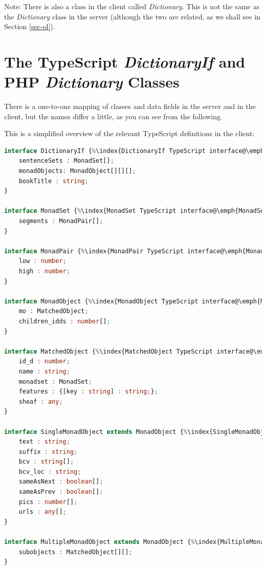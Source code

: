\documentclass[11pt,oneside,a4paper]{memoir}
\begin{document}
Note: There is also a class in the client called \emph{Dictionary}. This is not the same as the
\emph{Dictionary} class in the server (although the two are related, as we shall see in Section
\ref{sec-ol}).


\section{The TypeScript \emph{DictionaryIf} and PHP \emph{Dictionary} Classes}\label{sec-dictionaryif}%
%

There is a one-to-one mapping of classes and data fields in the server and in the client, but the
names differ a little, as you can see from the following.

This is a simplified overview of the relevant TypeScript definitions in the client:

\begin{lstlisting}[language=TypeScript]
interface DictionaryIf {%\index{DictionaryIf TypeScript interface@\emph{DictionaryIf} TypeScript interface}%
    sentenceSets : MonadSet[];
    monadObjects: MonadObject[][][];
    bookTitle : string;
}

interface MonadSet {%\index{MonadSet TypeScript interface@\emph{MonadSet} TypeScript interface}%
    segments : MonadPair[];
}

interface MonadPair {%\index{MonadPair TypeScript interface@\emph{MonadPair} TypeScript interface}%
    low : number;
    high : number;
}

interface MonadObject {%\index{MonadObject TypeScript interface@\emph{MonadObject} TypeScript interface}%
    mo : MatchedObject;
    children_idds : number[];
}

interface MatchedObject {%\index{MatchedObject TypeScript interface@\emph{MatchedObject} TypeScript interface}%
    id_d : number;
    name : string;
    monadset : MonadSet;
    features : {[key : string] : string;};
    sheaf : any;
}

interface SingleMonadObject extends MonadObject {%\index{SingleMonadObject TypeScript interface@\emph{SingleMonadObject} TypeScript interface}%
    text : string;
    suffix : string;
    bcv : string[];
    bcv_loc : string;
    sameAsNext : boolean[];
    sameAsPrev : boolean[];
    pics : number[];
    urls : any[];
}

interface MultipleMonadObject extends MonadObject {%\index{MultipleMonadObject TypeScript interface@\emph{MultipleMonadObject} TypeScript interface}%
    subobjects : MatchedObject[][];
}
\end{lstlisting}
\end{document}
